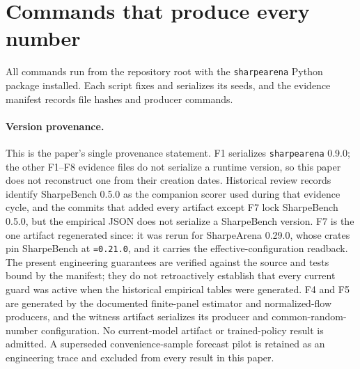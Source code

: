\section{Commands that produce every number}\label{app:commands}

All commands run from the repository root with the \texttt{sharpearena} Python package installed. Each script fixes and serializes its seeds, and the evidence manifest records file hashes and producer commands.

\paragraph{Version provenance.} This is the paper's single provenance statement. F1 serializes \texttt{sharpearena} 0.9.0; the other F1--F8 evidence files do not serialize a runtime version, so this paper does not reconstruct one from their creation dates. Historical review records identify SharpeBench 0.5.0 as the companion scorer used during that evidence cycle, and the commits that added every artifact except F7 lock SharpeBench 0.5.0, but the empirical JSON does not serialize a SharpeBench version. F7 is the one artifact regenerated since: it was rerun for SharpeArena 0.29.0, whose crates pin SharpeBench at \texttt{=0.21.0}, and it carries the effective-configuration readback. The present engineering guarantees are verified against the source and tests bound by the manifest; they do not retroactively establish that every current guard was active when the historical empirical tables were generated. F4 and F5 are generated by the documented finite-panel estimator and normalized-flow producers, and the witness artifact serializes its producer and common-random-number configuration. No current-model artifact or trained-policy result is admitted. A superseded convenience-sample forecast pilot is retained as an engineering trace and excluded from every result in this paper.

